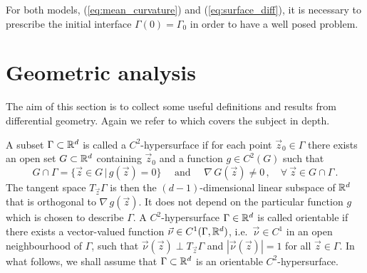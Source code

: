 For both models, (\ref{eq:mean_curvature}) and (\ref{eq:surface_diff}), it is
necessary to prescribe the initial interface $\Gamma(0)=\Gamma_0$ in order to
have a well posed problem.

\section{Geometric analysis}\label{sec:geometric_analysis}
The aim of this section is to collect some useful definitions and results from
differential geometry. Again we refer to \cite{DeckelnickDE05} which covers the
subject in depth.

A subset $\Gamma \subset {\mathbb R}^d$ is called a $C^2$-hypersurface if for each point
$\vec z_0 \in \Gamma$ there exists an open set $G \subset {\mathbb R}^d$ containing
$\vec z_0$ and a function $g \in C^2(G)$ such that
\begin{equation}
G \cap \Gamma = \{ \vec z \in G \, | \, g(\vec z) = 0 \}
\quad \mbox{ and } \quad \nabla \, G(\vec z) \neq 0\,,
\quad \forall\ \vec z \in G \cap \Gamma \, .
\end{equation}
The tangent space $T_{\vec z} \Gamma$ is then the $(d-1)$-dimensional linear
subspace of ${\mathbb R}^d$ that is orthogonal to $\nabla \, g(\vec z)$. It does not
depend on the particular function $g$ which is chosen to describe $\Gamma$. A
$C^2$-hypersurface $\Gamma \in {\mathbb R}^d$ is called orientable if there exists a
vector-valued function $\vec\nu \in C^1(\Gamma, {\mathbb R}^d)$, i.e.~$\vec\nu \in C^1$
in an open neighbourhood of $\Gamma$, such that $\vec\nu(\vec z) \perp T_{\vec
z} \Gamma$ and $|\vec{\nu}(\vec z)| = 1$ for all $\vec z \in \Gamma$. In what
follows, we shall assume that $\Gamma \subset {\mathbb R}^d$ is an orientable
$C^2$-hypersurface.

